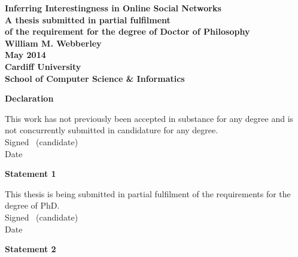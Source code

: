 




\frontmatter

\begin{titlepage}

\begin{center}
\vspace*{3ex}
\textbf{\Huge Inferring Interestingness in Online Social Networks}\\[2ex]
\textbf{\large A thesis submitted in partial fulfilment}\\[1ex]
\textbf{\large of the requirement for the degree of Doctor of Philosophy}\\[16ex]
\textbf{\LARGE William M. Webberley}\\
\vfill
\textbf{\LARGE May 2014}\\
\vfill
\textbf{\LARGE Cardiff University}\\[1ex]
\textbf{\LARGE School of Computer Science \& Informatics}\\[4ex]
\end{center}

\end{titlepage}

\newpage\thispagestyle{empty}\cleardoublepage


\thispagestyle{plain}

\vspace*{6ex}

\textbf{\large Declaration}

This work has not previously been accepted in substance for any degree and is not concurrently submitted in candidature for any degree.\\[2ex]
Signed \dotfill \ (candidate) \hspace*{10em}\\[1ex]
Date\ \ \ \ \ \dotfill \hspace*{18em}

\vfill

\textbf{\large Statement 1}

This thesis is being submitted in partial fulfilment of the requirements for the degree of PhD.\\[2ex]
Signed \dotfill \ (candidate) \hspace*{10em}\\[1ex]
Date\ \ \ \ \ \dotfill \hspace*{18em}

\textbf{\large Statement 2}

